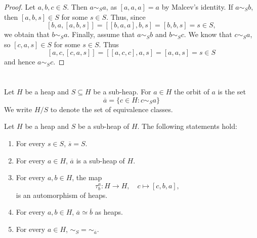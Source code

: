\documentclass{svmult}
\begin{document}
\begin{proof}
    Let $a,b,c\in S$. Then $a\sim_S a$, as $[a,a,a]=a$ by Malcev's identity. 
    If $a\sim_S b$, then $[a,b,s]\in S$ for some $s\in S$. Thus, since 
    \[
    [b,a,[a,b,s]]=[[b,a,a],b,s]=[b,b,s]=s\in S,
    \]
    we obtain that $b\sim_S a$. 
    Finally, assume that $a\sim_S b$ and $b\sim_S c$. We know that 
    $c\sim_S a$, so 
    $[c,a,s]\in S$ for some $s\in S$. Thus 
    \[
    [a,c,[c,a,s]]=[[a,c,c],a,s]=[a,a,s]=s\in S
    \]
    and hence $a\sim_S c$. 
\end{proof}

\section{}

Let $H$ be a heap and $S\subseteq H$ be a sub-heap. For $a\in H$ 
the orbit of $a$ is the set
\[
\overline{a}=\{c\in H:c\sim_S a\}
\]
We write $H/S$ to denote the set
of equivalence classes.

\begin{theorem}
    Let $H$ be a heap and $S$ be a sub-heap of $H$. The following statements hold:
    \begin{enumerate}
        \item For every $s\in S$, $\overline{s}=S$. 
        \item For every $a\in H$, $\overline{a}$ is a sub-heap of $H$.
        \item For every $a,b\in H$, 
        the map
        \[
        \tau_b^a\colon H\to H,\quad
        c\mapsto [c,b,a],
        \]
        is an automorphism of heaps. 
        \item For every $a,b\in H$, 
        $\overline{a}\simeq\overline{b}$ as heaps. 
        \item For every $a\in H$, $\sim_S=\sim_{\overline{a}}$. 
    \end{enumerate}
\end{theorem}
\end{document}
